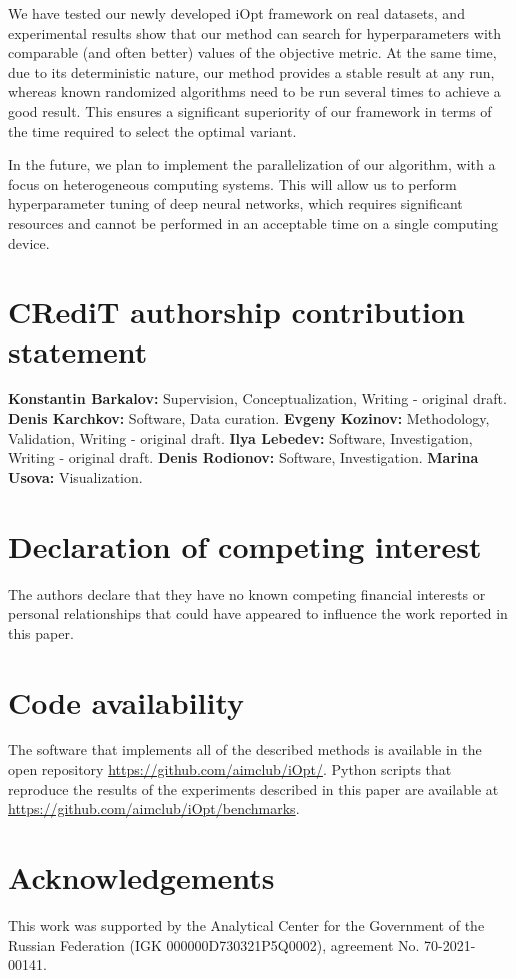 \documentclass[preprint,12pt]{elsarticle}
\begin{document}
We have tested our newly developed iOpt framework on real datasets, and experimental results show that our method can search for hyperparameters with comparable (and often better) values of the objective metric. At the same time, due to its deterministic nature, our method provides a stable result at any run, whereas known randomized algorithms need to be run several times to achieve a good result. This ensures a significant superiority of our framework in terms of the time required to select the optimal variant.

In the future, we plan to implement the parallelization of our algorithm, with a focus on heterogeneous computing systems. This will allow us to perform hyperparameter tuning of deep neural networks, which requires significant resources and cannot be performed in an acceptable time on a single computing device.


\section*{CRediT authorship contribution statement}

\textbf{Konstantin Barkalov:} Supervision, Conceptualization, Writing - original draft.
\textbf{Denis Karchkov:} Software, Data curation.
\textbf{Evgeny Kozinov:} Methodology, Validation, Writing - original draft.
\textbf{Ilya Lebedev:} Software, Investigation, Writing - original draft.
\textbf{Denis Rodionov:} Software, Investigation.
\textbf{Marina Usova:} Visualization.


\section*{Declaration of competing interest}

The authors declare that they have no known competing financial interests or personal relationships that could have appeared to influence the work reported in this paper.

\section*{Code availability}
The software that implements all of the described methods is available in the open repository \url{https://github.com/aimclub/iOpt/}.
Python scripts that reproduce the results of the experiments described in this paper are available at \url{https://github.com/aimclub/iOpt/benchmarks}.

\section*{Acknowledgements}
This work was supported by the Analytical Center for the Government of the Russian Federation (IGK 000000D730321P5Q0002), agreement No. 70-2021-00141.
\end{document}
